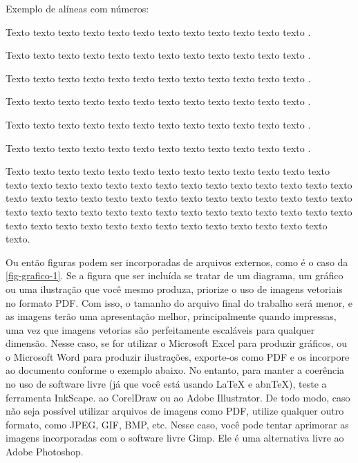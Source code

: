     Exemplo de alíneas com números:

    \begin{alineascomnumero}
	    \item Texto texto texto texto texto texto texto texto texto texto texto texto .
	    \item Texto texto texto texto texto texto texto texto texto texto texto texto .
	    \item Texto texto texto texto texto texto texto texto texto texto texto texto .
	    \item Texto texto texto texto texto texto texto texto texto texto texto texto .
	    \item Texto texto texto texto texto texto texto texto texto texto texto texto .
	    \item Texto texto texto texto texto texto texto texto texto texto texto texto .
    \end{alineascomnumero}

    Texto texto texto texto texto texto texto texto texto texto texto texto texto texto texto texto texto texto texto texto texto texto texto texto texto texto texto texto texto texto texto texto texto texto texto texto texto texto texto texto texto texto texto texto texto texto texto texto texto texto texto texto texto texto texto texto texto texto texto texto texto texto texto texto texto texto texto texto texto.

    Ou então figuras podem ser incorporadas de arquivos externos, como é o caso da \autoref{fig-grafico-1}. Se a figura que ser incluída se tratar de um diagrama, um gráfico ou uma ilustração que você mesmo produza, priorize o uso de imagens vetoriais no formato PDF. Com isso, o tamanho do arquivo final do trabalho será menor, e as imagens terão uma apresentação melhor, principalmente quando impressas, uma vez que imagens vetorias são perfeitamente escaláveis para qualquer dimensão. Nesse caso, se for utilizar o Microsoft Excel para produzir gráficos, ou o Microsoft Word para produzir ilustrações, exporte-os como PDF e os incorpore ao documento conforme o exemplo abaixo. No entanto, para manter a coerência no uso de software livre (já que você está usando LaTeX e abnTeX),  teste a ferramenta InkScape. ao CorelDraw ou ao Adobe Illustrator.  De todo modo, caso não seja possível  utilizar arquivos de imagens como PDF, utilize qualquer outro formato, como JPEG, GIF, BMP, etc.  Nesse caso, você pode tentar aprimorar as imagens incorporadas com o software livre Gimp. Ele é uma alternativa livre ao Adobe Photoshop.

